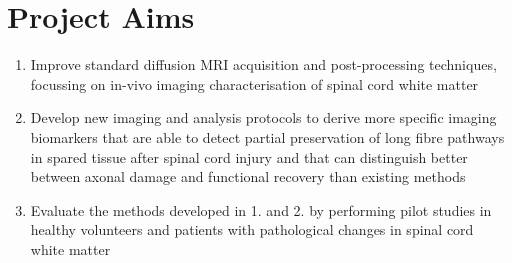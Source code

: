 \section{Project Aims}
\begin{enumerate}
	\item Improve standard diffusion MRI acquisition and post-processing techniques, focussing on in-vivo imaging characterisation of spinal cord white matter
	\item Develop new imaging and analysis protocols to derive more specific imaging biomarkers that are able to detect partial preservation of long fibre pathways in spared tissue after spinal cord injury and that can distinguish better between axonal damage and functional recovery than existing methods
	\item Evaluate the methods developed in 1. and 2. by performing pilot studies in healthy volunteers and patients with pathological changes in spinal cord white matter
\end{enumerate}
